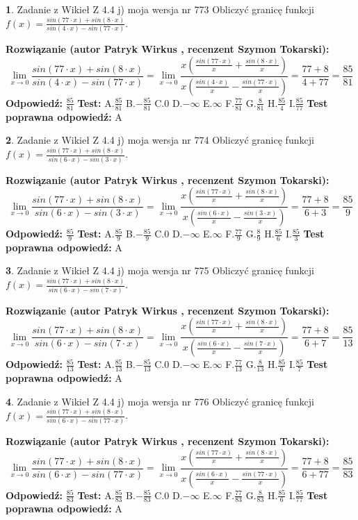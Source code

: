 \documentclass[12pt, a4paper]{article}
\theoremstyle{definition} %
\newtheorem{zad}{}
\newcommand{\zadStart}[1]{\begin{zad}#1\newline}
\newcommand{\zadStop}{\end{zad}}
\newcommand{\rozwStart}[2]{\noindent \textbf{Rozwiązanie (autor #1 , recenzent #2): }\newline}
\newcommand{\rozwStop}{\newline}
\newcommand{\odpStart}{\noindent \textbf{Odpowiedź:}\newline}
\newcommand{\odpStop}{\newline}
\newcommand{\testStart}{\noindent \textbf{Test:}\newline}
\newcommand{\testStop}{\newline}
\newcommand{\kluczStart}{\noindent \textbf{Test poprawna odpowiedź:}\newline}
\newcommand{\kluczStop}{\newline}
\begin{document}
\zadStart{Zadanie z Wikieł Z 4.4 j) moja wersja nr 773}
Obliczyć granicę funkcji $f(x)=\frac{sin(77\cdot x) +sin(8\cdot x)}{sin(4\cdot x) -sin(77\cdot x)}$.
\zadStop
\rozwStart{Patryk Wirkus}{Szymon Tokarski}
$$\lim\limits_{x\to 0}\frac{sin(77\cdot x) +sin(8\cdot x)}{sin(4\cdot x) -sin(77\cdot x)}=\lim\limits_{x\to 0}\frac{x(\frac{sin(77\cdot x)}{x}+\frac{sin(8\cdot x)}{x})}{x(\frac{sin(4\cdot x)}{x}-\frac{sin(77\cdot x)}{x})}=\frac{77+8}{4+77} = \frac{85}{81}$$
\rozwStop
\odpStart
$\frac{85}{81}$
\odpStop
\testStart
A.$\frac{85}{81}$
B.$-\frac{85}{81}$
C.$0$
D.$-\infty$
E.$\infty$
F.$\frac{77}{81}$
G.$\frac{8}{81}$
H.$\frac{85}{4}$
I.$\frac{85}{77}$
\testStop
\kluczStart
A
\kluczStop



\zadStart{Zadanie z Wikieł Z 4.4 j) moja wersja nr 774}
Obliczyć granicę funkcji $f(x)=\frac{sin(77\cdot x) +sin(8\cdot x)}{sin(6\cdot x) -sin(3\cdot x)}$.
\zadStop
\rozwStart{Patryk Wirkus}{Szymon Tokarski}
$$\lim\limits_{x\to 0}\frac{sin(77\cdot x) +sin(8\cdot x)}{sin(6\cdot x) -sin(3\cdot x)}=\lim\limits_{x\to 0}\frac{x(\frac{sin(77\cdot x)}{x}+\frac{sin(8\cdot x)}{x})}{x(\frac{sin(6\cdot x)}{x}-\frac{sin(3\cdot x)}{x})}=\frac{77+8}{6+3} = \frac{85}{9}$$
\rozwStop
\odpStart
$\frac{85}{9}$
\odpStop
\testStart
A.$\frac{85}{9}$
B.$-\frac{85}{9}$
C.$0$
D.$-\infty$
E.$\infty$
F.$\frac{77}{9}$
G.$\frac{8}{9}$
H.$\frac{85}{6}$
I.$\frac{85}{3}$
\testStop
\kluczStart
A
\kluczStop



\zadStart{Zadanie z Wikieł Z 4.4 j) moja wersja nr 775}
Obliczyć granicę funkcji $f(x)=\frac{sin(77\cdot x) +sin(8\cdot x)}{sin(6\cdot x) -sin(7\cdot x)}$.
\zadStop
\rozwStart{Patryk Wirkus}{Szymon Tokarski}
$$\lim\limits_{x\to 0}\frac{sin(77\cdot x) +sin(8\cdot x)}{sin(6\cdot x) -sin(7\cdot x)}=\lim\limits_{x\to 0}\frac{x(\frac{sin(77\cdot x)}{x}+\frac{sin(8\cdot x)}{x})}{x(\frac{sin(6\cdot x)}{x}-\frac{sin(7\cdot x)}{x})}=\frac{77+8}{6+7} = \frac{85}{13}$$
\rozwStop
\odpStart
$\frac{85}{13}$
\odpStop
\testStart
A.$\frac{85}{13}$
B.$-\frac{85}{13}$
C.$0$
D.$-\infty$
E.$\infty$
F.$\frac{77}{13}$
G.$\frac{8}{13}$
H.$\frac{85}{6}$
I.$\frac{85}{7}$
\testStop
\kluczStart
A
\kluczStop



\zadStart{Zadanie z Wikieł Z 4.4 j) moja wersja nr 776}
Obliczyć granicę funkcji $f(x)=\frac{sin(77\cdot x) +sin(8\cdot x)}{sin(6\cdot x) -sin(77\cdot x)}$.
\zadStop
\rozwStart{Patryk Wirkus}{Szymon Tokarski}
$$\lim\limits_{x\to 0}\frac{sin(77\cdot x) +sin(8\cdot x)}{sin(6\cdot x) -sin(77\cdot x)}=\lim\limits_{x\to 0}\frac{x(\frac{sin(77\cdot x)}{x}+\frac{sin(8\cdot x)}{x})}{x(\frac{sin(6\cdot x)}{x}-\frac{sin(77\cdot x)}{x})}=\frac{77+8}{6+77} = \frac{85}{83}$$
\rozwStop
\odpStart
$\frac{85}{83}$
\odpStop
\testStart
A.$\frac{85}{83}$
B.$-\frac{85}{83}$
C.$0$
D.$-\infty$
E.$\infty$
F.$\frac{77}{83}$
G.$\frac{8}{83}$
H.$\frac{85}{6}$
I.$\frac{85}{77}$
\testStop
\kluczStart
A
\kluczStop
\end{document}
